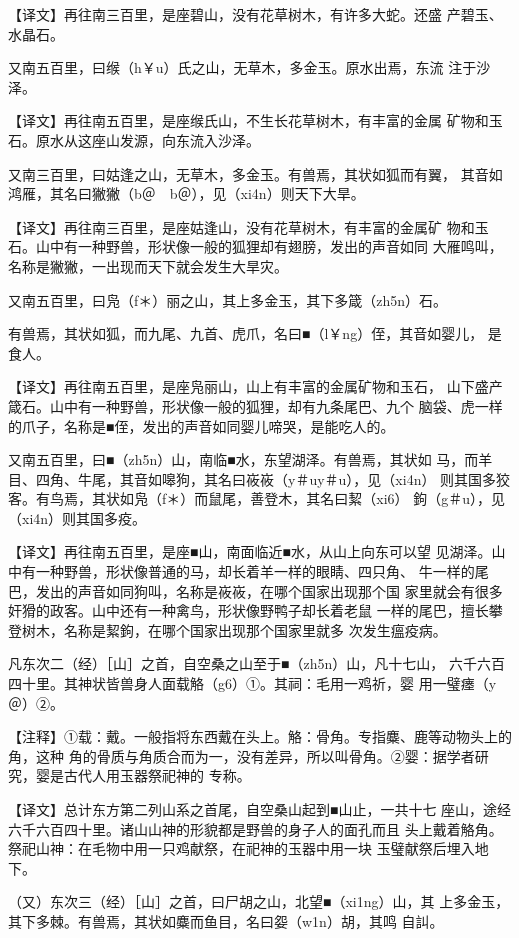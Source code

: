 \documentclass[a4paper,12pt,UTF8,twoside]{ctexbook}
\begin{document}
【译文】再往南三百里，是座碧山，没有花草树木，有许多大蛇。还盛 产碧玉、水晶石。

又南五百里，曰缑（h￥u）氏之山，无草木，多金玉。原水出焉，东流 注于沙泽。

【译文】再往南五百里，是座缑氏山，不生长花草树木，有丰富的金属 矿物和玉石。原水从这座山发源，向东流入沙泽。

又南三百里，曰姑逢之山，无草木，多金玉。有兽焉，其状如狐而有翼， 其音如鸿雁，其名曰獙獙（b＠　b＠），见（xi4n）则天下大旱。

【译文】再往南三百里，是座姑逢山，没有花草树木，有丰富的金属矿 物和玉石。山中有一种野兽，形状像一般的狐狸却有翅膀，发出的声音如同 大雁鸣叫，名称是獙獙，一出现而天下就会发生大旱灾。

又南五百里，曰凫（f＊）丽之山，其上多金玉，其下多箴（zh5n）石。

有兽焉，其状如狐，而九尾、九首、虎爪，名曰■（l￥ng）侄，其音如婴儿， 是食人。

【译文】再往南五百里，是座凫丽山，山上有丰富的金属矿物和玉石， 山下盛产箴石。山中有一种野兽，形状像一般的狐狸，却有九条尾巴、九个 脑袋、虎一样的爪子，名称是■侄，发出的声音如同婴儿啼哭，是能吃人的。

又南五百里，曰■（zh5n）山，南临■水，东望湖泽。有兽焉，其状如 马，而羊目、四角、牛尾，其音如嗥狗，其名曰峳峳（y＃uy＃u），见（xi4n） 则其国多狡客。有鸟焉，其状如凫（f＊）而鼠尾，善登木，其名曰絜（xi6） 鉤（g＃u），见（xi4n）则其国多疫。

【译文】再往南五百里，是座■山，南面临近■水，从山上向东可以望 见湖泽。山中有一种野兽，形状像普通的马，却长着羊一样的眼睛、四只角、 牛一样的尾巴，发出的声音如同狗叫，名称是峳峳，在哪个国家出现那个国 家里就会有很多奸猾的政客。山中还有一种禽鸟，形状像野鸭子却长着老鼠 一样的尾巴，擅长攀登树木，名称是絜鉤，在哪个国家出现那个国家里就多 次发生瘟疫病。

凡东次二（经）［山］之首，自空桑之山至于■（zh5n）山，凡十七山， 六千六百四十里。其神状皆兽身人面载觡（g6）①。其祠：毛用一鸡祈，婴 用一璧瘗（y＠）②。

【注释】①载：戴。一般指将东西戴在头上。觡：骨角。专指麋、鹿等动物头上的角，这种 角的骨质与角质合而为一，没有差异，所以叫骨角。②婴：据学者研究，婴是古代人用玉器祭祀神的 专称。

【译文】总计东方第二列山系之首尾，自空桑山起到■山止，一共十七 座山，途经六千六百四十里。诸山山神的形貌都是野兽的身子人的面孔而且 头上戴着觡角。祭祀山神：在毛物中用一只鸡献祭，在祀神的玉器中用一块 玉璧献祭后埋入地下。

（又）东次三（经）［山］之首，曰尸胡之山，北望■（xi1ng）山，其 上多金玉，其下多棘。有兽焉，其状如麋而鱼目，名曰妴（w1n）胡，其鸣 自訆。
\end{document}
